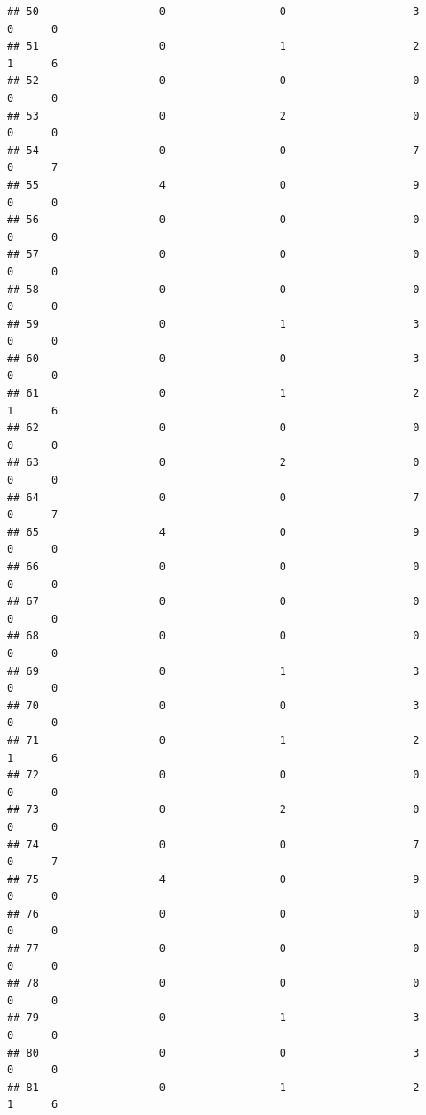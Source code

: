 \documentclass[
]{article}
\begin{document}
\begin{verbatim}
## 50                   0                  0                    3        0      0
## 51                   0                  1                    2        1      6
## 52                   0                  0                    0        0      0
## 53                   0                  2                    0        0      0
## 54                   0                  0                    7        0      7
## 55                   4                  0                    9        0      0
## 56                   0                  0                    0        0      0
## 57                   0                  0                    0        0      0
## 58                   0                  0                    0        0      0
## 59                   0                  1                    3        0      0
## 60                   0                  0                    3        0      0
## 61                   0                  1                    2        1      6
## 62                   0                  0                    0        0      0
## 63                   0                  2                    0        0      0
## 64                   0                  0                    7        0      7
## 65                   4                  0                    9        0      0
## 66                   0                  0                    0        0      0
## 67                   0                  0                    0        0      0
## 68                   0                  0                    0        0      0
## 69                   0                  1                    3        0      0
## 70                   0                  0                    3        0      0
## 71                   0                  1                    2        1      6
## 72                   0                  0                    0        0      0
## 73                   0                  2                    0        0      0
## 74                   0                  0                    7        0      7
## 75                   4                  0                    9        0      0
## 76                   0                  0                    0        0      0
## 77                   0                  0                    0        0      0
## 78                   0                  0                    0        0      0
## 79                   0                  1                    3        0      0
## 80                   0                  0                    3        0      0
## 81                   0                  1                    2        1      6

\end{verbatim}
\end{document}
